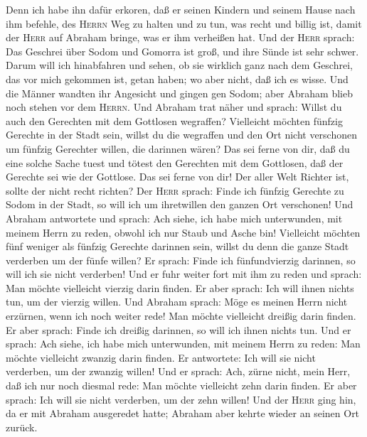  Denn ich habe ihn dafür erkoren, daß er seinen Kindern
und seinem Hause nach ihm befehle, des \textsc{Herrn} Weg zu halten und
zu tun, was recht und billig ist, damit der \textsc{Herr} auf Abraham
bringe, was er ihm verheißen hat.  Und der \textsc{Herr}
sprach: Das Geschrei über Sodom und Gomorra ist groß, und ihre Sünde ist
sehr schwer.  Darum will ich hinabfahren und sehen, ob
sie wirklich ganz nach dem Geschrei, das vor mich gekommen ist, getan
haben; wo aber nicht, daß ich es wisse.  Und die Männer
wandten ihr Angesicht und gingen gen Sodom; aber Abraham blieb noch
stehen vor dem \textsc{Herrn}.  Und Abraham trat näher
und sprach: Willst du auch den Gerechten mit dem Gottlosen wegraffen?
 Vielleicht möchten fünfzig Gerechte in der Stadt sein,
willst du die wegraffen und den Ort nicht verschonen um fünfzig
Gerechter willen, die darinnen wären?  Das sei ferne von
dir, daß du eine solche Sache tuest und tötest den Gerechten mit dem
Gottlosen, daß der Gerechte sei wie der Gottlose. Das sei ferne von dir!
Der aller Welt Richter ist, sollte der nicht recht richten?
 Der \textsc{Herr} sprach: Finde ich fünfzig Gerechte zu
Sodom in der Stadt, so will ich um ihretwillen den ganzen Ort
verschonen!  Und Abraham antwortete und sprach: Ach
siehe, ich habe mich unterwunden, mit meinem Herrn zu reden, obwohl ich
nur Staub und Asche bin!  Vielleicht möchten fünf weniger
als fünfzig Gerechte darinnen sein, willst du denn die ganze Stadt
verderben um der fünfe willen? Er sprach: Finde ich fünfundvierzig
darinnen, so will ich sie nicht verderben!  Und er fuhr
weiter fort mit ihm zu reden und sprach: Man möchte vielleicht vierzig
darin finden. Er aber sprach: Ich will ihnen nichts tun, um der vierzig
willen.  Und Abraham sprach: Möge es meinen Herrn nicht
erzürnen, wenn ich noch weiter rede! Man möchte vielleicht dreißig darin
finden. Er aber sprach: Finde ich dreißig darinnen, so will ich ihnen
nichts tun.  Und er sprach: Ach siehe, ich habe mich
unterwunden, mit meinem Herrn zu reden: Man möchte vielleicht zwanzig
darin finden. Er antwortete: Ich will sie nicht verderben, um der
zwanzig willen!  Und er sprach: Ach, zürne nicht, mein
Herr, daß ich nur noch diesmal rede: Man möchte vielleicht zehn darin
finden. Er aber sprach: Ich will sie nicht verderben, um der zehn
willen!  Und der \textsc{Herr} ging hin, da er mit
Abraham ausgeredet hatte; Abraham aber kehrte wieder an seinen Ort
zurück.

